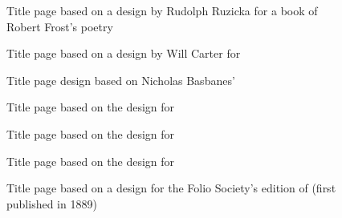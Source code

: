 \documentclass[10pt,a4paper,oneside,extrafontsizes]{memoir}%
\begin{document}
\begin{figure}
\centering
\begin{showtitle}
\titleRF
\end{showtitle}
\caption{Title page based on a design by Rudolph Ruzicka for a book of Robert Frost's poetry} \label{fig:titleRF}
\end{figure}


\begin{figure}
\centering
\begin{showtitle}
\titleAM
\end{showtitle}
\caption{Title page based on a design by Will Carter for
} \label{fig:titleAM}
\end{figure}


\begin{figure}
\centering
\begin{showtitle}
\titlePM
\end{showtitle}
\caption{Title page design based on Nicholas Basbanes' } \label{fig:titlePM}
\end{figure}


\begin{figure}
\centering
\begin{showtitle}
\titleAT
\end{showtitle}
\caption{Title page based on the design for } \label{fig:titleAT}
\end{figure}


\begin{figure}
\centering
\begin{showtitle}
\titleLL
\end{showtitle}
\caption{Title page based on the design for } \label{fig:titleLL}
\end{figure}


\begin{figure}
\centering
\begin{showtitle}
\titleSW
\end{showtitle}
\caption{Title page based on the design for } \label{fig:titleSW}
\end{figure}


\begin{figure}
\centering
\begin{showtitle}
\titleTMB
\end{showtitle}
\caption{Title page based on a design for the Folio Society's edition of
   (first published in 1889)} \label{fig:titleTMB}
\end{figure}
\end{document}
